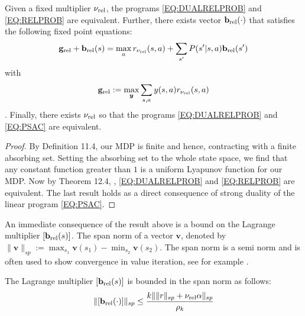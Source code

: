 \begin{lemma}\label{LEM:DUAL}
    Given a fixed multiplier $\mathbf{\nu_{\text{rel}}}$, the programs \eqref{EQ:DUALRELPROB} and \eqref{EQ:RELPROB} are equivalent. Further, there exists vector $\mathbf{b}_{\text{rel}}(\cdot)$ that satisfies the following fixed point equations:
    \[
    \mathbf{g}_{\text{rel}} + \mathbf{b}_{\text{rel}}(s) = \max_{a} r_{\mathbf{\nu_{\text{rel}}}}(s, a) + \sum_{s'} P(s'|s, a) \mathbf{b}_{\text{rel}}(s')
    \]
    with
    \[
    \mathbf{g}_{\text{rel}} := \max_{{\bm{y}}} \sum_{s, a} y(s, a) r_{\mathbf{\nu_{\text{rel}}}}(s, a) 
    \]
    . Finally, there exists $\mathbf{\nu_{\text{rel}}}$ so that the programs \eqref{EQ:DUALRELPROB} and \eqref{EQ:PSAC} are equivalent.  
\end{lemma}
\begin{proof}
    By Definition 11.4,  \cite{altman1999constrained} our MDP is finite and hence, contracting with a finite absorbing set. Setting the absorbing set to the whole state space, we find that any constant function greater than $1$ is a uniform Lyapunov function for our MDP. Now by Theorem 12.4, \cite{altman1999constrained}, \eqref{EQ:DUALRELPROB} and \eqref{EQ:RELPROB} are equivalent. 
    The last result holds as a direct consequence of strong duality of the linear program \eqref{EQ:PSAC}. 
\end{proof}
     An immediate consequence of the result  above is a bound on the Lagrange multiplier $[\mathbf{b}_{\text{rel}}(s)]$. The span norm of a vector $\mathbf{v}$, denoted by $\|\mathbf{v}\|_{sp} := \max_{s_1}\mathbf{v}(s_1) - \min_{s_2}\mathbf{v}(s_2)$. The span norm is a semi norm and is often used to show convergence in value iteration, see for example \cite{puterman2014markov}. 
\begin{lemma}\label{LEM::BIASBOUND}
    The Lagrange multiplier $[\mathbf{b}_{\text{rel}}(s)]$ is bounded in the span norm as follows:
    \[
    \|[\mathbf{b}_{\text{rel}}(\cdot)]\|_{sp} \leq \frac{k \|\|r\|_{sp} + \mathbf{\nu_{\text{rel}}} \alpha \|_{sp}}{\rho_{k}}
    \]
\end{lemma}
